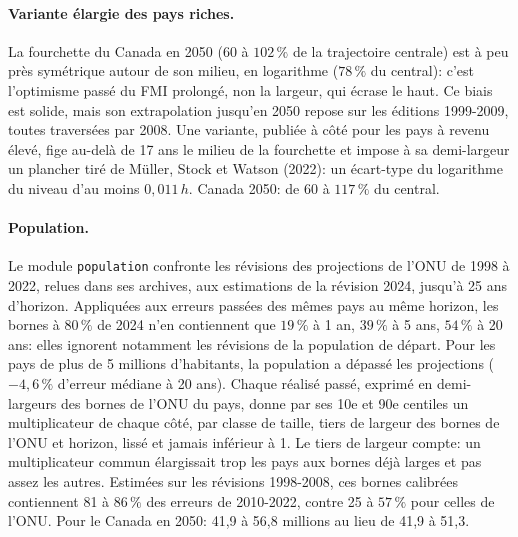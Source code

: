 \documentclass[11pt,a4paper]{article}
\begin{document}
\paragraph{Variante élargie des pays riches.} La fourchette du Canada en 2050 (60 à $102\,\%$ de la trajectoire centrale) est à peu près symétrique autour de son milieu, en logarithme ($78\,\%$ du central): c'est l'optimisme passé du FMI prolongé, non la largeur, qui écrase le haut. Ce biais est solide, mais son extrapolation jusqu'en 2050 repose sur les éditions 1999-2009, toutes traversées par 2008. Une variante, publiée à côté pour les pays à revenu élevé, fige au-delà de 17 ans le milieu de la fourchette et impose à sa demi-largeur un plancher tiré de Müller, Stock et Watson (2022): un écart-type du logarithme du niveau d'au moins $0{,}011\,h$. Canada 2050: de 60 à $117\,\%$ du central.

\paragraph{Population.} Le module \texttt{population} confronte les révisions des projections de l'ONU de 1998 à 2022, relues dans ses archives, aux estimations de la révision 2024, jusqu'à 25 ans d'horizon. Appliquées aux erreurs passées des mêmes pays au même horizon, les bornes à $80\,\%$ de 2024 n'en contiennent que $19\,\%$ à 1 an, $39\,\%$ à 5 ans, $54\,\%$ à 20 ans: elles ignorent notamment les révisions de la population de départ. Pour les pays de plus de 5 millions d'habitants, la population a dépassé les projections ($-4{,}6\,\%$ d'erreur médiane à 20 ans). Chaque réalisé passé, exprimé en demi-largeurs des bornes de l'ONU du pays, donne par ses 10e et 90e centiles un multiplicateur de chaque côté, par classe de taille, tiers de largeur des bornes de l'ONU et horizon, lissé et jamais inférieur à 1. Le tiers de largeur compte: un multiplicateur commun élargissait trop les pays aux bornes déjà larges et pas assez les autres. Estimées sur les révisions 1998-2008, ces bornes calibrées contiennent 81 à $86\,\%$ des erreurs de 2010-2022, contre 25 à $57\,\%$ pour celles de l'ONU. Pour le Canada en 2050: 41,9 à 56,8 millions au lieu de 41,9 à 51,3.
\end{document}
